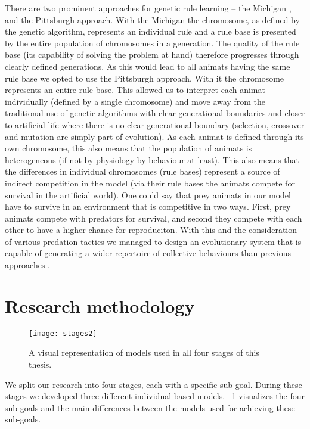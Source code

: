 There are two prominent approaches for genetic rule learning -- the Michigan \cite{holland1977cognitive}, and the Pittsburgh \cite{smith1980learning} approach. With the Michigan the chromosome, as defined by the genetic algorithm, represents an individual rule and a rule base is presented by the entire population of chromosomes in a generation. The quality of the rule base (its capability of solving the problem at hand) therefore progresses through clearly defined generations. As this would lead to all animats having the same rule base we opted to use the Pittsburgh approach. With it the chromosome represents an entire rule base. This allowed us to interpret each animat individually (defined by a single chromosome) and move away from the traditional use of genetic algorithms with clear generational boundaries and closer to artificial life where there is no clear generational boundary (selection, crossover and mutation are simply part of evolution). As each animat is defined through its own chromosome, this also means that the population of animats is heterogeneous (if not by physiology by behaviour at least). This also means that the differences in individual chromosomes (rule bases) represent a source of indirect competition in the model (via their rule bases the animats compete for survival in the artificial world). One could say that prey animats in our model have to survive in an environment that is competitive in two ways. First, prey animats compete with predators for survival, and second they compete with each other to have a higher chance for reproduciton. With this and the consideration of various predation tactics we managed to design an evolutionary system that is capable of generating a wider repertoire of collective behaviours than previous approaches \cite{biswas2014causes,hein2015evolution,olson2013predator,olson2015exploring,olson2016evolution,reynolds1993evolved,sayers2009evolved,spector2003emergence,wood2007evolving}.

\section{Research methodology}

\begin{figure}
  \texttt{[image: stages2]}
  \caption{A visual representation of models used in all four stages of this thesis.}
  \label{fig:stages}
\end{figure}

We split our research into four stages, each with a specific sub-goal. During these stages we developed three different individual-based models. \figurename~\ref{fig:stages} visualizes the four sub-goals and the main differences between the models used for achieving these sub-goals.

